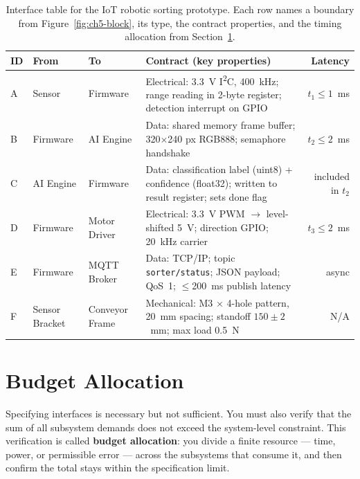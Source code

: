 \begin{table}[htbp]
  \centering
  \caption{Interface table for the IoT robotic sorting prototype.
           Each row names a boundary from Figure~\ref{fig:ch5-block},
           its type, the contract properties, and the timing allocation
           from Section~\ref{sec:ch5-budgets}.}
  \label{tab:ch5-interface}
  \small
  \begin{tabular}{lllp{5.5cm}r}
    \hline
    \textbf{ID} & \textbf{From} & \textbf{To} & \textbf{Contract (key properties)} & \textbf{Latency} \\
    \hline
    A & Sensor & Firmware & Electrical: 3.3~V I\textsuperscript{2}C, 400~kHz; range reading in 2-byte register; detection interrupt on GPIO & $t_1 \leq 1$~ms \\
    B & Firmware & AI Engine & Data: shared memory frame buffer; 320$\times$240 px RGB888; semaphore handshake & $t_2 \leq 2$~ms \\
    C & AI Engine & Firmware & Data: classification label (uint8) + confidence (float32); written to result register; sets done flag & included in $t_2$ \\
    D & Firmware & Motor Driver & Electrical: 3.3~V PWM $\to$ level-shifted 5~V; direction GPIO; 20~kHz carrier & $t_3 \leq 2$~ms \\
    E & Firmware & MQTT Broker & Data: TCP/IP; topic \texttt{sorter/status}; JSON payload; QoS~1; $\leq$200~ms publish latency & async \\
    F & Sensor Bracket & Conveyor Frame & Mechanical: M3 $\times$ 4-hole pattern, 20~mm spacing; standoff $150 \pm 2$~mm; max load 0.5~N & N/A \\
    \hline
  \end{tabular}
\end{table}

\section{Budget Allocation}
\label{sec:ch5-budgets}

Specifying interfaces is necessary but not sufficient.
You must also verify that the sum of all subsystem demands does not exceed the system-level constraint.
This verification is called \textbf{budget allocation}: you divide a finite resource --- time, power, or permissible error --- across the subsystems that consume it, and then confirm the total stays within the specification limit.

